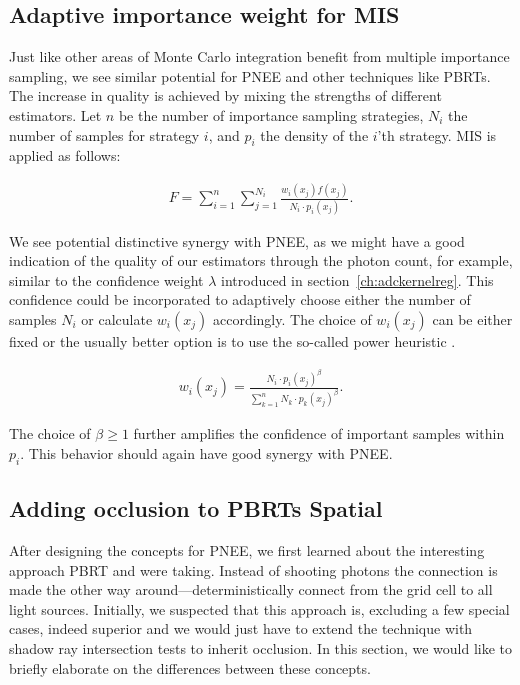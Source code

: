\subsection{Adaptive importance weight for MIS}

Just like other areas of Monte Carlo integration benefit from multiple importance sampling, we see similar potential for PNEE and other techniques like PBRTs. The increase in quality is achieved by mixing the strengths of different estimators. Let $n$ be the number of importance sampling strategies, $N_i$ the number of samples for strategy $i$, and $p_i$ the density of the $i$'th strategy. MIS is applied as follows:

\begin{align}
F = \sum_{i=1}^{n}\sum_{j=1}^{N_i}\frac{w_i(x_j)f(x_j)}{N_i \cdot p_i(x_j)}.
\label{eq:mis}
\end{align}

We see potential distinctive synergy with PNEE, as we might have a good indication of the quality of our estimators through the photon count, for example, similar to the confidence weight $\lambda$ introduced in section~\ref{ch:adckernelreg}. This confidence could be incorporated to adaptively choose either the number of samples $N_i$ or calculate $w_i(x_j)$ accordingly. The choice of $w_i(x_j)$ can be either fixed or the usually better option is to use the so-called power heuristic \parencite{veach1997robust}.

\begin{align}
w_i(x_j) = \frac{N_i \cdot p_i(x_j)^\beta}{\sum_{k=1}^{n} N_k \cdot p_k(x_j)^\beta}.
\label{eq:powerheuristic}
\end{align}

The choice of $\beta \geq 1$ further amplifies the confidence of important samples within $p_i$. This behavior should again have good synergy with PNEE.


\subsection{Adding occlusion to PBRTs Spatial}
\label{sec:pbrtoccl}

After designing the concepts for PNEE, we first learned about the interesting approach PBRT and \textcite{Vevoda} were taking. Instead of shooting photons the connection is made the other way around---deterministically connect from the grid cell to all light sources. Initially, we suspected that this approach is, excluding a few special cases, indeed superior and we would just have to extend the technique with shadow ray intersection tests to inherit occlusion. In this section, we would like to briefly elaborate on the differences between these concepts.

